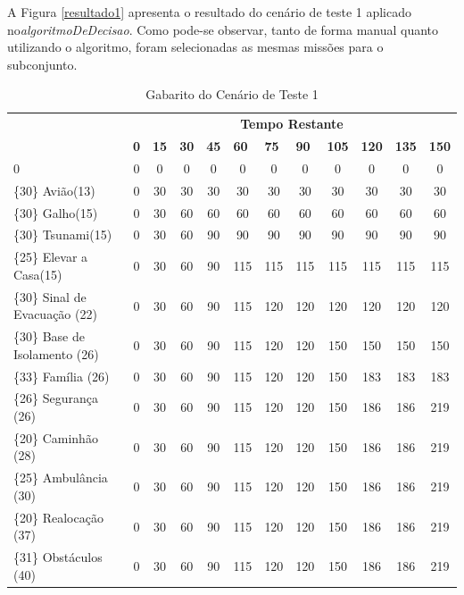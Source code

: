 A Figura \ref{resultado1} apresenta o resultado do cenário de teste 1 aplicado no\textit{algoritmoDeDecisao}. Como pode-se observar, tanto de forma manual quanto utilizando o algoritmo, foram selecionadas as mesmas missões para o subconjunto.

\begin{table}[!h]
\centering
\caption{Gabarito do Cenário de Teste 1}
\label{gabarito1}
\begin{tabular}{lccccccccccc}
\multicolumn{1}{c}{\cellcolor[HTML]{00D2CB}} & \multicolumn{11}{c}{\cellcolor[HTML]{00D2CB}\textbf{Tempo Restante}} \\ 
\multicolumn{1}{c}{\cellcolor[HTML]{00D2CB}{\color[HTML]{333333} \textbf{\{Valor\} Missão(Tempo)}}} & 
\multicolumn{1}{l}{\cellcolor[HTML]{C0F2F0}\textbf{0}} & 
\multicolumn{1}{l}{\cellcolor[HTML]{C0F2F0}\textbf{15}} & 
\multicolumn{1}{l}{\cellcolor[HTML]{C0F2F0}\textbf{30}} & 
\multicolumn{1}{l}{\cellcolor[HTML]{C0F2F0}\textbf{45}} & 
\multicolumn{1}{l}{\cellcolor[HTML]{C0F2F0}\textbf{60}} & 
\multicolumn{1}{l}{\cellcolor[HTML]{C0F2F0}\textbf{75}} & 
\multicolumn{1}{l}{\cellcolor[HTML]{C0F2F0}\textbf{90}} & 
\multicolumn{1}{l}{\cellcolor[HTML]{C0F2F0}\textbf{105}} & 
\multicolumn{1}{l}{\cellcolor[HTML]{C0F2F0}\textbf{120}} & 
\multicolumn{1}{l}{\cellcolor[HTML]{C0F2F0}\textbf{135}} & 
\multicolumn{1}{l}{\cellcolor[HTML]{C0F2F0}\textbf{150}} \\ 
0 & 0 & 0 & 0 & 0 & 0 & 0 & 0 & 0 & 0 & 0 & 0  \\ 
\{30\}  Avião(13) & 0 & 30 & 30 & 30 & 30 & 30 & 30 & 30 & 30 & 30 & 30 \\ 
\{30\}  Galho(15) & 0 & 30 & 60 & 60 & 60 & 60 & 60 & 60 & 60 & 60 & 60  \\ 
\{30\}  Tsunami(15) & 0 & 30 & 60 & 90 & 90 & 90 & 90 & 90 & 90 & 90 & 90 \\ 
{\color[HTML]{FE0000} \{25\}  Elevar a Casa(15)}& 0 & 30 & 60 & 90 & 115  & 115  & 115  & 115 & 115 & 115 & 115 \\ 
\{30\}  Sinal de Evacuação (22) & 0 & 30 & 60 & 90 & 115  & 120  & 120  & 120 & 120 & 120 & 120 \\ 
\{30\}  Base de Isolamento (26) & 0 & 30 & 60 & 90 & 115  & 120  & 120  & 150 & 150 & 150 & 150 \\ 
\{33\}  Família (26) & 0 & 30 & 60 & 90 & 115  & 120  & 120  & 150 & 183 & 183 & 183 \\ 
\{26\}  Segurança (26) & 0 & 30 & 60 & 90 & 115  & 120  & 120  & 150 & 186 & 186 & 219 \\ 
{\color[HTML]{FE0000} \{20\}  Caminhão (28)} & 0 & 30 & 60 & 90 & 115  & 120  & 120  & 150 & 186 & 186 & 219 \\ 
{\color[HTML]{FE0000} \{25\}  Ambulância (30)} & 0 & 30 & 60 & 90 & 115  & 120  & 120  & 150 & 186 & 186 & 219 \\ 
{\color[HTML]{FE0000} \{20\}  Realocação (37)} & 0 & 30 & 60 & 90 & 115  & 120  & 120  & 150 & 186 & 186 & 219 \\ 
{\color[HTML]{FE0000} \{31\}  Obstáculos (40)} & 0 & 30 & 60 & 90 & 115  & 120  & 120  & 150 & 186 & 186 & 219 \\ 
\end{tabular}
\end{table}


